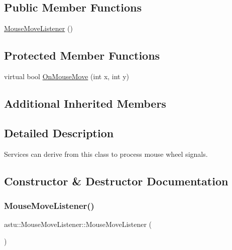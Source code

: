 \subsection*{Public Member Functions}
\begin{DoxyCompactItemize}
\item 
\hyperlink{classastu_1_1MouseMoveListener_adb92b15669fe2a28d109421a6fb577f6}{Mouse\+Move\+Listener} ()
\end{DoxyCompactItemize}
\subsection*{Protected Member Functions}
\begin{DoxyCompactItemize}
\item 
virtual bool \hyperlink{classastu_1_1MouseMoveListener_a7d7602641d244ebc119a2210352c8593}{On\+Mouse\+Move} (int x, int y)
\end{DoxyCompactItemize}
\subsection*{Additional Inherited Members}


\subsection{Detailed Description}
Services can derive from this class to process mouse wheel signals. 

\subsection{Constructor \& Destructor Documentation}
\mbox{\label{classastu_1_1MouseMoveListener_adb92b15669fe2a28d109421a6fb577f6}} 
\subsubsection{\texorpdfstring{Mouse\+Move\+Listener()}{MouseMoveListener()}}
{\footnotesize\ttfamily astu\+::\+Mouse\+Move\+Listener\+::\+Mouse\+Move\+Listener (\begin{DoxyParamCaption}{ }\end{DoxyParamCaption})\hspace{0.3cm}{\ttfamily [inline]}}


